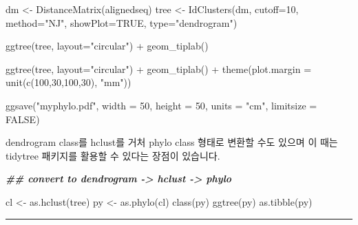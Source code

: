\documentclass[
]{book}
\newenvironment{Shaded}{\begin{snugshade}}{\end{snugshade}}
\newcommand{\AttributeTok}[1]{\textcolor[rgb]{0.77,0.63,0.00}{#1}}
\newcommand{\ConstantTok}[1]{\textcolor[rgb]{0.00,0.00,0.00}{#1}}
\newcommand{\DecValTok}[1]{\textcolor[rgb]{0.00,0.00,0.81}{#1}}
\newcommand{\DocumentationTok}[1]{\textcolor[rgb]{0.56,0.35,0.01}{\textbf{\textit{#1}}}}
\newcommand{\FunctionTok}[1]{\textcolor[rgb]{0.00,0.00,0.00}{#1}}
\newcommand{\NormalTok}[1]{#1}
\newcommand{\OtherTok}[1]{\textcolor[rgb]{0.56,0.35,0.01}{#1}}
\newcommand{\SpecialCharTok}[1]{\textcolor[rgb]{0.00,0.00,0.00}{#1}}
\newcommand{\StringTok}[1]{\textcolor[rgb]{0.31,0.60,0.02}{#1}}
\begin{document}
\begin{Shaded}
\begin{Highlighting}[]
\NormalTok{dm }\OtherTok{\textless{}{-}} \FunctionTok{DistanceMatrix}\NormalTok{(alignedseq)}
\NormalTok{tree }\OtherTok{\textless{}{-}} \FunctionTok{IdClusters}\NormalTok{(dm, }\AttributeTok{cutoff=}\DecValTok{10}\NormalTok{, }\AttributeTok{method=}\StringTok{"NJ"}\NormalTok{, }\AttributeTok{showPlot=}\ConstantTok{TRUE}\NormalTok{, }\AttributeTok{type=}\StringTok{"dendrogram"}\NormalTok{)}

\FunctionTok{ggtree}\NormalTok{(tree, }\AttributeTok{layout=}\StringTok{"circular"}\NormalTok{) }\SpecialCharTok{+}
  \FunctionTok{geom\_tiplab}\NormalTok{()}

\FunctionTok{ggtree}\NormalTok{(tree, }\AttributeTok{layout=}\StringTok{"circular"}\NormalTok{) }\SpecialCharTok{+}
  \FunctionTok{geom\_tiplab}\NormalTok{() }\SpecialCharTok{+} 
  \FunctionTok{theme}\NormalTok{(}\AttributeTok{plot.margin =} \FunctionTok{unit}\NormalTok{(}\FunctionTok{c}\NormalTok{(}\DecValTok{100}\NormalTok{,}\DecValTok{30}\NormalTok{,}\DecValTok{100}\NormalTok{,}\DecValTok{30}\NormalTok{), }\StringTok{"mm"}\NormalTok{))}

\FunctionTok{ggsave}\NormalTok{(}\StringTok{"myphylo.pdf"}\NormalTok{, }\AttributeTok{width =} \DecValTok{50}\NormalTok{, }\AttributeTok{height =} \DecValTok{50}\NormalTok{, }\AttributeTok{units =} \StringTok{"cm"}\NormalTok{, }\AttributeTok{limitsize =} \ConstantTok{FALSE}\NormalTok{)}
\end{Highlighting}
\end{Shaded}

dendrogram class를 hclust를 거처 phylo class 형태로 변환할 수도 있으며 이 때는 tidytree 패키지를 활용할 수 있다는 장점이 있습니다.

\begin{Shaded}
\begin{Highlighting}[]
\DocumentationTok{\#\# convert to dendrogram {-}\textgreater{} hclust {-}\textgreater{} phylo }

\NormalTok{cl }\OtherTok{\textless{}{-}} \FunctionTok{as.hclust}\NormalTok{(tree)}
\NormalTok{py }\OtherTok{\textless{}{-}} \FunctionTok{as.phylo}\NormalTok{(cl)}
\FunctionTok{class}\NormalTok{(py)}
\FunctionTok{ggtree}\NormalTok{(py)}
\FunctionTok{as.tibble}\NormalTok{(py)}
\end{Highlighting}
\end{Shaded}

\begin{center}\rule{0.5\linewidth}{0.5pt}\end{center}
\end{document}

